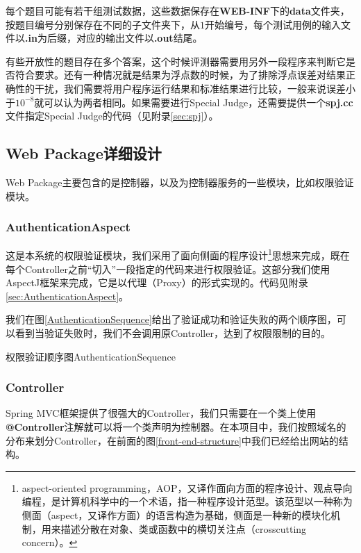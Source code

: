 每个题目可能有若干组测试数据，这些数据保存在\textbf{WEB-INF}下的\textbf{data}文件夹，按题目编号分别保存在不同的子文件夹下，从$1$开始编号，每个测试用例的输入文件以\textbf{.in}为后缀，对应的输出文件以\textbf{.out}结尾。

有些开放性的题目存在多个答案，这个时候评测器需要用另外一段程序来判断它是否符合要求。还有一种情况就是结果为浮点数的时候，为了排除浮点误差对结果正确性的干扰，我们需要将用户程序运行结果和标准结果进行比较，一般来说误差小于$10^{-8}$就可以认为两者相同。如果需要进行Special Judge，还需要提供一个\textbf{spj.cc}文件指定Special Judge的代码（见附录\ref{sec:spj}）。

\subsection{Web Package详细设计}
Web Package主要包含的是控制器，以及为控制器服务的一些模块，比如权限验证模块。

\subsubsection{AuthenticationAspect}
这是本系统的权限验证模块，我们采用了面向侧面的程序设计\footnote{aspect-oriented programming，AOP，又译作面向方面的程序设计、观点导向编程，是计算机科学中的一个术语，指一种程序设计范型。该范型以一种称为侧面（aspect，又译作方面）的语言构造为基础，侧面是一种新的模块化机制，用来描述分散在对象、类或函数中的横切关注点（crosscutting concern）。}思想来完成，既在每个Controller之前``切入''一段指定的代码来进行权限验证。这部分我们使用AspectJ框架来完成，它是以代理（Proxy）的形式实现的。代码见附录\ref{sec:AuthenticationAspect}。

我们在图\ref{AuthenticationSequence}给出了验证成功和验证失败的两个顺序图，可以看到当验证失败时，我们不会调用原Controller，达到了权限限制的目的。

\begin{pics}[htbp]{权限验证顺序图}{AuthenticationSequence}
\end{pics}

\subsubsection{Controller}
Spring MVC框架提供了很强大的Controller，我们只需要在一个类上使用\textbf{@Controller}注解就可以将一个类声明为控制器。在本项目中，我们按照域名的分布来划分Controller，在前面的图\ref{front-end-structure}中我们已经给出网站的结构。

